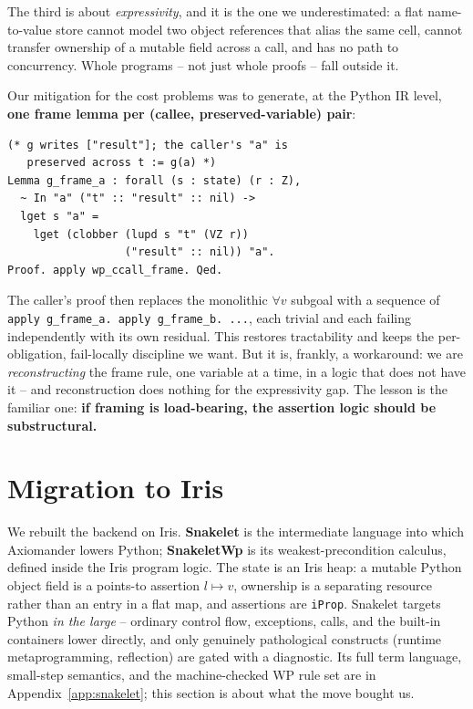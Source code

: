\documentclass[sigconf,nonacm]{acmart}
\newcommand{\pto}{\mapsto}
\newcommand{\code}[1]{\texttt{#1}}
\begin{document}
\noindent The third is about \emph{expressivity}, and it is the one we
underestimated: a flat name-to-value store cannot model two object references
that alias the same cell, cannot transfer ownership of a mutable field across a
call, and has no path to concurrency. Whole programs -- not just whole proofs --
fall outside it.

Our mitigation for the cost problems was to generate, at the Python IR level,
\textbf{one frame lemma per (callee, preserved-variable) pair}:

\begin{lstlisting}
(* g writes ["result"]; the caller's "a" is
   preserved across t := g(a) *)
Lemma g_frame_a : forall (s : state) (r : Z),
  ~ In "a" ("t" :: "result" :: nil) ->
  lget s "a" =
    lget (clobber (lupd s "t" (VZ r))
                  ("result" :: nil)) "a".
Proof. apply wp_ccall_frame. Qed.
\end{lstlisting}

The caller's proof then replaces the monolithic $\forall v$ subgoal with a
sequence of \code{apply g\_frame\_a. apply g\_frame\_b. ...}, each trivial and
each failing independently with its own residual. This restores tractability and
keeps the per-obligation, fail-locally discipline we want. But it is, frankly, a
workaround: we are \emph{reconstructing} the frame rule, one variable at a time,
in a logic that does not have it -- and reconstruction does nothing for the
expressivity gap. The lesson is the familiar one: \textbf{if framing is
load-bearing, the assertion logic should be substructural.}

\section{Migration to Iris}
\label{sec:iris}

We rebuilt the backend on Iris. \textbf{Snakelet} is the intermediate language
into which Axiomander lowers Python; \textbf{SnakeletWp} is its
weakest-precondition calculus, defined inside the Iris program logic. The state
is an Iris heap: a mutable Python object field is a points-to assertion
$l \pto v$, ownership is a separating resource rather than an entry in a flat
map, and assertions are \code{iProp}. Snakelet targets Python \emph{in the
large} -- ordinary control flow, exceptions, calls, and the built-in containers
lower directly, and only genuinely pathological constructs (runtime
metaprogramming, reflection) are gated with a diagnostic. Its full term language,
small-step semantics, and the machine-checked WP rule set are in
Appendix~\ref{app:snakelet}; this section is about what the move bought us.
\end{document}
